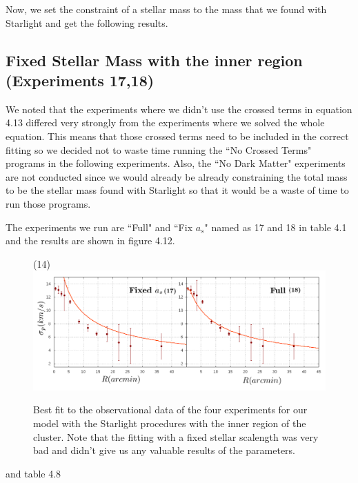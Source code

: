 Now, we set the constraint of a stellar mass to the mass that we found with Starlight and get the following results.

\subsection{Fixed Stellar Mass with the inner region (Experiments 17,18)}

We noted that the experiments where we didn't use the crossed terms in equation 4.13 differed very strongly from the experiments where we solved the whole equation. This means that those crossed terms need to be included in the correct fitting so we decided not to waste time running the ``No Crossed Terms" programs in the following experiments. Also, the ``No Dark Matter" experiments are not conducted since we would already be already constraining the total mass to be the stellar mass found with Starlight so that it would be a waste of time to run those programs.

The experiments we run are ``Full" and ``Fix $a_s$" named as 17 and 18 in table 4.1 and the results are shown in figure 4.12.

\begin{figure}[H]
\centering(14)
\includegraphics[width=15cm]{images/Starlight_2.png}
\caption[Best fit of our model with the mass found with the Starlight procedures with the inner region]{Best fit to the observational data of the four experiments for our model with the Starlight procedures with the inner region of the cluster. Note that the fitting with a fixed stellar scalength was very bad and didn't give us any valuable results of the parameters.}
\end{figure}

and table 4.8 

